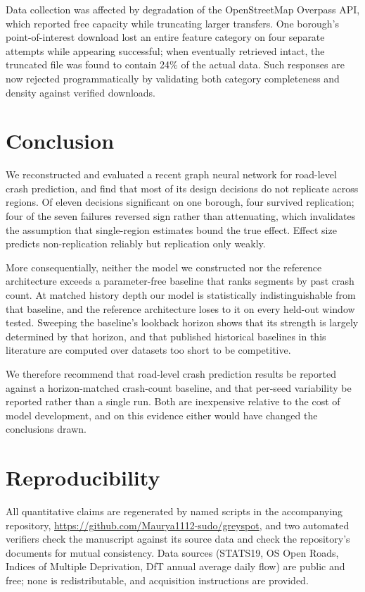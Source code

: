 \documentclass[conference]{IEEEtran}
\begin{document}
Data collection was affected by degradation of the OpenStreetMap Overpass
API, which reported free capacity while truncating larger transfers. One
borough's point-of-interest download lost an entire feature category on
four separate attempts while appearing successful; when eventually
retrieved intact, the truncated file was found to contain 24\% of the
actual data. Such responses are now rejected programmatically by
validating both category completeness and density against verified
downloads.

\section{Conclusion}

We reconstructed and evaluated a recent graph neural network for
road-level crash prediction, and find that most of its design decisions do
not replicate across regions. Of eleven decisions significant on one
borough, four survived replication; four of the seven failures reversed
sign rather than attenuating, which invalidates the assumption that
single-region estimates bound the true effect. Effect size predicts
non-replication reliably but replication only weakly.

More consequentially, neither the model we constructed nor the reference
architecture exceeds a parameter-free baseline that ranks segments by past
crash count. At matched history depth our model is statistically
indistinguishable from that baseline, and the reference architecture loses
to it on every held-out window tested. Sweeping the baseline's lookback
horizon shows that its strength is largely determined by that horizon, and
that published historical baselines in this literature are computed over
datasets too short to be competitive.

We therefore recommend that road-level crash prediction results be
reported against a horizon-matched crash-count baseline, and that per-seed
variability be reported rather than a single run. Both are inexpensive
relative to the cost of model development, and on this evidence either
would have changed the conclusions drawn.

\section*{Reproducibility}

All quantitative claims are regenerated by named scripts in the
accompanying repository, \url{https://github.com/Maurya1112-sudo/greyspot},
and two automated verifiers check the manuscript against its source data
and check the repository's documents for mutual consistency. Data sources
(STATS19, OS Open Roads, Indices of Multiple Deprivation, DfT annual
average daily flow) are public and free; none is redistributable, and
acquisition instructions are provided.
\end{document}
